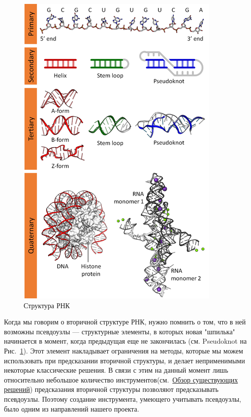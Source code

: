 \documentclass[14pt]{matmex-diploma-custom}
\begin{document}
\begin{figure}[h]
	\centering
	\includegraphics{pics/DNA_RNA_structure_(full).png}
	\caption{Структура РНК~\cite{Wikipediapic}}
	\label{fig:Структура}
\end{figure}
Когда мы говорим о вторичной структуре РНК, нужно помнить о том, что в ней возможны псевдоузлы --- структурные элементы, в которых новая "шпилька" начинается в момент, когда предыдущая еще не закончилась (см. Pseudoknot на Рис.~\ref{fig:Структура}). Этот элемент накладывает ограничения на методы, которые мы можем использовать при предсказании вторичной структуры, и делает неприменимыми некоторые классические решения. В связи с этим на данный момент лишь относительно небольшое количество инструментов(см.~\hyperref[obzor]{Обзор существующих решений}) предсказания вторичной структуры позволяют предсказывать псевдоузлы. Поэтому создание инструмента, умеющего учитывать псевдоузлы, было одним из направлений нашего проекта.
\end{document}
